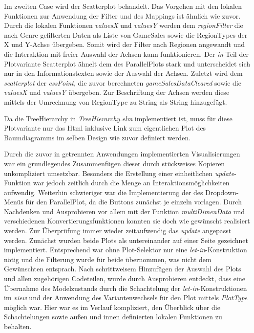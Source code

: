 \documentclass[usegeometry=true]{scrartcl}
\begin{document}
Im zweiten Case wird der Scatterplot behandelt. 
Das Vorgehen mit den lokalen Funktionen zur Anwendung der Filter und des Mappings ist ähnlich wie zuvor.
Durch die lokalen Funktionen \textit{valuesX} und \textit{valuesY} werden dem \textit{regionFilter} die nach Genre gefilterten Daten als Liste von GameSales sowie die RegionTypes der X und Y-Achse übergeben.
Somit wird der Filter nach Regionen angewandt und die Interaktion mit freier Auswahl der Achsen kann funktionieren.
Der \textit{in}-Teil der Plotvariante Scatterplot ähnelt dem des ParallelPlots stark und unterscheidet sich nur in den Informationstexten sowie der Auswahl der Achsen.
Zuletzt wird dem \textit{scatterplot} der \textit{cssPoint}, die zuvor berechneten \textit{gameSalesDataCleared} sowie die \textit{valuesX} und \textit{valuesY} übergeben.
Zur Beschriftung der Achsen werden diese mittels der Umrechnung von RegionType zu String als String hinzugefügt.

Da die TreeHierarchy in \textit{TreeHierarchy.elm} implementiert ist, muss für diese Plotvariante nur das Html inklusive Link zum eigentlichen Plot des Baumdiagramms im selben Design wie zuvor definiert werden.

Durch die zuvor in getrennten Anwendungen implementierten Visualisierungen war ein grundlegendes Zusammenfügen dieser durch stückweises Kopieren unkompliziert umsetzbar.
Besonders die Erstellung einer einheitlichen \textit{update}-Funktion war jedoch zeitlich durch die Menge an Interaktionsmöglichkeiten aufwendig.
Weiterhin schwieriger war die Implementierung der des Dropdown-Menüs für den ParallelPlot, da die Buttons zunächst je einzeln vorlagen. 
Durch Nachdenken und Ausprobieren vor allem mit der Funktion \textit{multiDimenData} und verschiedenen Konvertierungsfunktionen konnten sie doch wie gewünscht realisiert werden.
Zur Überprüfung immer wieder zeitaufwendig das \textit{update} angepasst werden.
Zunächst wurden beide Plots als untereinander auf einer Seite gezeichnet implementiert.
Entsprechend war ohne Plot-Selektor nur eine \textit{let-in}-Konstruktion nötig und die Filterung wurde für beide übernommen, was nicht dem Gewünschten entsprach.
Nach schrittweisem Hinzufügen der Auswahl des Plots und allen zugehörigen Codeteilen, wurde durch Ausprobieren entdeckt, dass eine Übernahme des Modelzustands durch die Schachtelung der \textit{let-in}-Konstruktionen im \textit{view} und der Anwendung des Variantenwechsels für den Plot mittels \textit{PlotType} möglich war. 
Hier war es im Verlauf kompliziert, den Überblick über die Schachtelungen sowie außen und innen definierten lokalen Funktionen zu behalten.
\end{document}
